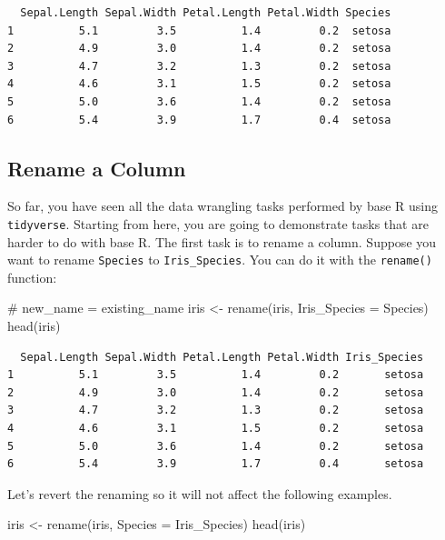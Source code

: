 \documentclass[
  letterpaper,
  DIV=11,
  numbers=noendperiod]{scrreprt}
\newenvironment{Shaded}{\begin{snugshade}}{\end{snugshade}}
\newcommand{\AttributeTok}[1]{\textcolor[rgb]{0.40,0.45,0.13}{#1}}
\newcommand{\CommentTok}[1]{\textcolor[rgb]{0.37,0.37,0.37}{#1}}
\newcommand{\FunctionTok}[1]{\textcolor[rgb]{0.28,0.35,0.67}{#1}}
\newcommand{\NormalTok}[1]{\textcolor[rgb]{0.00,0.23,0.31}{#1}}
\newcommand{\OtherTok}[1]{\textcolor[rgb]{0.00,0.23,0.31}{#1}}
\begin{document}
\begin{verbatim}
  Sepal.Length Sepal.Width Petal.Length Petal.Width Species
1          5.1         3.5          1.4         0.2  setosa
2          4.9         3.0          1.4         0.2  setosa
3          4.7         3.2          1.3         0.2  setosa
4          4.6         3.1          1.5         0.2  setosa
5          5.0         3.6          1.4         0.2  setosa
6          5.4         3.9          1.7         0.4  setosa
\end{verbatim}

\subsection{Rename a Column}\label{rename-a-column}

So far, you have seen all the data wrangling tasks performed by base R
using \texttt{tidyverse}. Starting from here, you are going to
demonstrate tasks that are harder to do with base R. The first task is
to rename a column. Suppose you want to rename \texttt{Species} to
\texttt{Iris\_Species}. You can do it with the \texttt{rename()}
function:

\begin{Shaded}
\begin{Highlighting}[]
\CommentTok{\# new\_name = existing\_name}
\NormalTok{iris }\OtherTok{\textless{}{-}} \FunctionTok{rename}\NormalTok{(iris, }\AttributeTok{Iris\_Species =}\NormalTok{ Species)}
\FunctionTok{head}\NormalTok{(iris)}
\end{Highlighting}
\end{Shaded}

\begin{verbatim}
  Sepal.Length Sepal.Width Petal.Length Petal.Width Iris_Species
1          5.1         3.5          1.4         0.2       setosa
2          4.9         3.0          1.4         0.2       setosa
3          4.7         3.2          1.3         0.2       setosa
4          4.6         3.1          1.5         0.2       setosa
5          5.0         3.6          1.4         0.2       setosa
6          5.4         3.9          1.7         0.4       setosa
\end{verbatim}

Let's revert the renaming so it will not affect the following examples.

\begin{Shaded}
\begin{Highlighting}[]
\NormalTok{iris }\OtherTok{\textless{}{-}} \FunctionTok{rename}\NormalTok{(iris, }\AttributeTok{Species =}\NormalTok{ Iris\_Species)}
\FunctionTok{head}\NormalTok{(iris)}
\end{Highlighting}
\end{Shaded}
\end{document}
